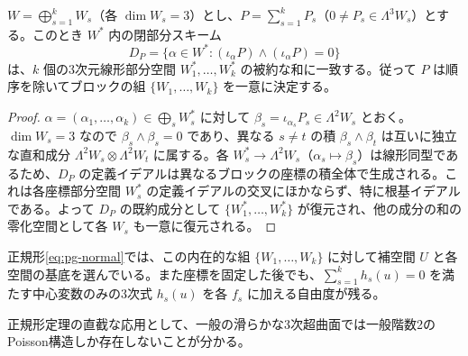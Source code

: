 \begin{lemma}[縮約双ベクトルによるブロックの復元]\label{ne:blocks}
$W=\bigoplus_{s=1}^k W_s$（各 $\dim W_s=3$）とし、$P=\sum_{s=1}^k P_s$（$0\ne P_s\in\Lambda^3 W_s$）とする。このとき $W^*$ 内の閉部分スキーム
\begin{equation}
D_P=\{\alpha\in W^*:(\iota_\alpha P)\wedge(\iota_\alpha P)=0\}
\end{equation}
は、$k$ 個の3次元線形部分空間 $W_1^*,\ldots,W_k^*$ の被約な和に一致する。従って $P$ は順序を除いてブロックの組 $\{W_1,\ldots,W_k\}$ を一意に決定する。
\end{lemma}
\begin{proof}
$\alpha=(\alpha_1,\ldots,\alpha_k)\in\bigoplus_s W_s^*$ に対して $\beta_s=\iota_{\alpha_s}P_s\in\Lambda^2 W_s$ とおく。$\dim W_s=3$ なので $\beta_s\wedge\beta_s=0$ であり、異なる $s\ne t$ の積 $\beta_s\wedge\beta_t$ は互いに独立な直和成分 $\Lambda^2 W_s\otimes\Lambda^2 W_t$ に属する。各 $W_s^*\to\Lambda^2 W_s$（$\alpha_s\mapsto\beta_s$）は線形同型であるため、$D_P$ の定義イデアルは異なるブロックの座標の積全体で生成される。これは各座標部分空間 $W_s^*$ の定義イデアルの交叉にほかならず、特に根基イデアルである。よって $D_P$ の既約成分として $\{W_1^*,\ldots,W_k^*\}$ が復元され、他の成分の和の零化空間として各 $W_s$ も一意に復元される。
\end{proof}

正規形\eqref{eq:pg-normal}では、この内在的な組 $\{W_1,\ldots,W_k\}$ に対して補空間 $U$ と各空間の基底を選んでいる。また座標を固定した後でも、$\sum_{s=1}^k h_s(u)=0$ を満たす中心変数のみの3次式 $h_s(u)$ を各 $f_s$ に加える自由度が残る。

正規形定理の直截な応用として、一般の滑らかな3次超曲面では一般階数2のPoisson構造しか存在しないことが分かる。

